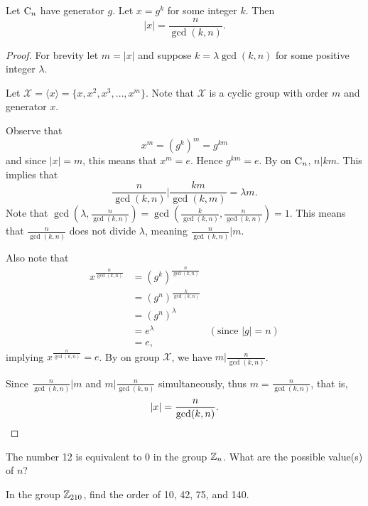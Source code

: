 \newpage

\begin{theorem}\label{thrm-order-of-element-in-cyclic-group}
    Let $\mathrm{C}_{n}$ have generator $g$. Let $x = g^k$ for some integer $k$. Then
    \[
        |x| = \frac{n}{\gcd(k,n)}.
    \]
\end{theorem}
\begin{proof}
    For brevity let $m = |x|$ and suppose $k = \lambda \gcd(k, n)$ for some positive integer $\lambda$.

    Let $\mathcal{X} = \langle x \rangle = \{x, x^2, x^3, \dots, x^m\}$. Note that $\mathcal{X}$ is a cyclic group with order $m$ and generator $x$.

    Observe that
    \[
        x^m = \left(g^k\right)^m = g^{km}
    \]
    and since $|x| = m$, this means that $x^m = e$. Hence $g^{km} = e$. By  on $\mathrm{C}_{n}$, $n \vert km$. This implies that
    \[
        \frac{n}{\gcd(k,n)} \vert \frac{km}{\gcd(k,m)} = \lambda m.
    \]
    Note that $\gcd\left(\lambda, \frac{n}{\gcd(k,n)}\right) = \gcd\left(\frac{k}{\gcd(k,n)}, \frac{n}{\gcd(k,n)}\right) = 1$. This means that $\frac{n}{\gcd(k,n)}$ does not divide $\lambda$, meaning $\frac{n}{\gcd(k,n)} \vert m$.

    Also note that
    \begin{align*}
        x^{\frac{n}{\gcd(k,n)}} &= \left(g^k\right)^{\frac{n}{\gcd(k,n)}}\\
        &= \left(g^n\right)^{\frac{k}{\gcd(k,n)}}\\
        &= \left(g^n\right)^\lambda\\
        &= e^\lambda & (\text{since } |g| = n)\\
        &= e,
    \end{align*}
    implying $x^{\frac{n}{\gcd(k,n)}} = e$. By  on group $\mathcal{X}$, we have $m \vert \frac{n}{\gcd(k,n)}$.

    Since $\frac{n}{\gcd(k,n)} \vert m$ and $m \vert \frac{n}{\gcd(k,n)}$ simultaneously, thus $m = \frac{n}{\gcd(k,n)}$, that is,
    \[
        |x| = \frac{n}{\gcd(k,n)}.\qedhere
    \]
\end{proof}

\begin{exercise}
    The number 12 is equivalent to 0 in the group $\mathbb{Z}_n$. What are the possible value(s) of $n$?
\end{exercise}
\begin{exercise}
    In the group $\mathbb{Z}_{210}$, find the order of 10, 42, 75, and 140.
\end{exercise}

